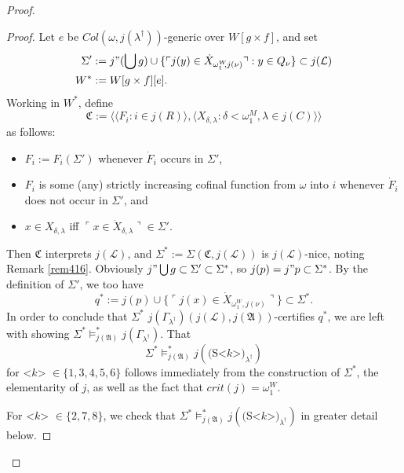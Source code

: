 \documentclass[12pt, twoside]{memoir}
\numberwithin{equation}{section}
\theoremstyle{definition}
\theoremstyle{remark}
\theoremstyle{definition}
\theoremstyle{definition}
\theoremstyle{definition}
\theoremstyle{remark}
\begin{document}
\begin{proof}
\begin{proof}
Let $e$ be $Col(\omega, j(\lambda^{\dagger}))$-generic over $W[g \times f]$, and set
\begin{align*}
    \Sigma' & := j" (\bigcup g) \cup \{\ulcorner j(y) \in \dot{X}_{\omega_1^W \!\! , j(\nu)} \urcorner : y \in Q_{\nu}\} \subset j(\mathcal{L}) \\
    W^* & := W[g \times f][e] \text{.}
\end{align*} 
Working in $W^*$, define $$\mathfrak{C} := \langle \langle F_i : i \in j(R) \rangle, \langle X_{\delta, \lambda} : \delta < \omega_1^M, \lambda \in j(C) \rangle \rangle$$ as follows:
\begin{itemize}
    \item $F_i := F_i(\Sigma')$ whenever $\dot{F}_i$ occurs in $\Sigma'$,
    \item $F_i$ is some (any) strictly increasing cofinal function from $\omega$ into $i$ whenever $\dot{F}_i$ does not occur in $\Sigma'$, and
    \item $x \in X_{\delta, \lambda}$ iff $\ulcorner x \in \dot{X}_{\delta, \lambda} \urcorner \in \Sigma'$.
\end{itemize}
Then $\mathfrak{C}$ interprets $j(\mathcal{L})$, and $\Sigma^* := \Sigma(\mathfrak{C}, j(\mathcal{L}))$ is $j(\mathcal{L})$-nice, noting Remark \ref{rem416}. Obviously $j" \bigcup g \subset \Sigma' \subset \Sigma^*$, so $j(p) = j" p \subset \Sigma^*$. By the definition of $\Sigma'$, we too have $$q^* := j(p) \cup \{\ulcorner j(x) \in \dot{X}_{\omega_1^W \!\! , j(\nu)} \urcorner\} \subset \Sigma^*.$$ In order to conclude that $\Sigma^*$ $j(\Gamma_{\lambda^{\dagger}})(j(\mathcal{L}), j(\mathfrak{A}))$-certifies $q^*$, we are left with showing $\Sigma^* \models^*_{j(\mathfrak{A})} j(\Gamma_{\lambda^{\dagger}})$. That $$\Sigma^* \models^*_{j(\mathfrak{A})} j(\text{(S<} k \text{>)}_{\lambda^{\dagger}})$$ for <$k$> $\in \{1, 3, 4, 5, 6\}$ follows immediately from the construction of $\Sigma^*$, the elementarity of $j$, as well as the fact that $crit(j) = \omega_1^W$.

For <$k$> $\in \{2, 7, 8\}$, we check that $\Sigma^* \models^*_{j(\mathfrak{A})} j(\text{(S<} k \text{>)}_{\lambda^{\dagger}})$ in greater detail below. 


\end{proof}
\end{proof}
\end{document}
